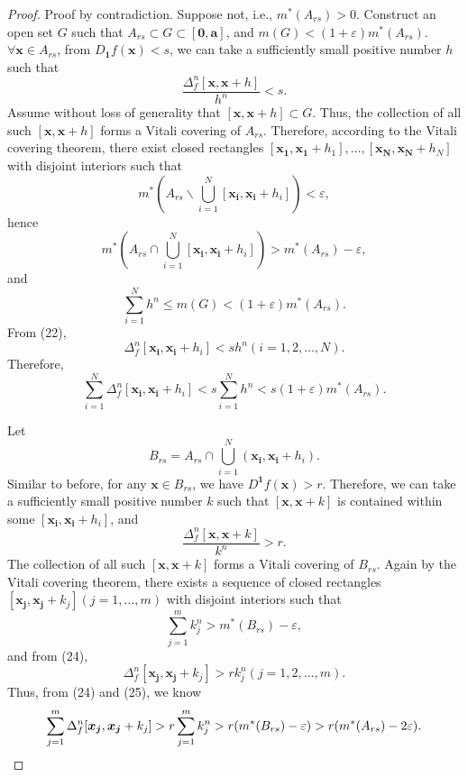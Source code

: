 \documentclass{ijclclp}
\begin{document}
\begin{proof}
    Proof by contradiction. Suppose not, i.e., \(m^{*}(A_{rs})>0\). Construct an open set \(G\) such that \(A_{rs}\subset G\subset[\boldsymbol{0},\boldsymbol{a}]\), and \(m(G)<(1+\varepsilon)m^{*}(A_{rs})\). \(\forall \boldsymbol{x}\in A_{rs}\), from \(D_{\boldsymbol{1}}f(\boldsymbol{x})<s\), we can take a sufficiently small positive number \(h\) such that
    \begin{equation}
        \frac{\Delta_f^n[\boldsymbol{x},\boldsymbol{x}+h]}{h^n}<s.
    \end{equation}
    Assume without loss of generality that \([\boldsymbol{x},\boldsymbol{x}+h]\subset G\). Thus, the collection of all such \([\boldsymbol{x},\boldsymbol{x}+h]\) forms a Vitali covering of \(A_{rs}\). Therefore, according to the Vitali covering theorem, there exist closed rectangles \([\boldsymbol{x_1},\boldsymbol{x_1}+h_1],\dots,[\boldsymbol{x_N},\boldsymbol{x_N}+h_N]\) with disjoint interiors such that
    \[m^{*}\left(A_{rs}\backslash\bigcup_{i=1}^{N}[\boldsymbol{x_i},\boldsymbol{x_i}+h_i]\right)<\varepsilon,\]
    hence 
    \[m^{*}\left(A_{rs}\cap\bigcup_{i=1}^{N}[\boldsymbol{x_i},\boldsymbol{x_i}+h_i]\right)>m^{*}(A_{rs})-\varepsilon,\]
    and 
    \[\sum_{i=1}^{N}h^n\leqslant m(G)<(1+\varepsilon)m^{*}(A_{rs}).\]
    From (22), 
    \[\Delta_f^n[\boldsymbol{x_i},\boldsymbol{x_i}+h_i]<sh^n(i=1,2,\dots,N).\]
    Therefore, 
    \begin{equation}
        \sum_{i=1}^{N}\Delta_f^n[\boldsymbol{x_i},\boldsymbol{x_i}+h_i]<s\sum_{i=1}^{N}h^n<s(1+\varepsilon)m^{*}(A_{rs}).
    \end{equation}
    
    Let
    \[B_{rs}=A_{rs}\cap\bigcup_{i=1}^{N}(\boldsymbol{x_i},\boldsymbol{x_i}+h_i).\]
    Similar to before, for any \(\boldsymbol{x}\in B_{rs}\), we have \(D^{\boldsymbol{1}}f(\boldsymbol{x})>r\). Therefore, we can take a sufficiently small positive number \(k\) such that \([\boldsymbol{x},\boldsymbol{x}+k]\) is contained within some \([\boldsymbol{x_i},\boldsymbol{x_i}+h_i]\), and
    \begin{equation}
        \frac{\Delta_f^n[\boldsymbol{x},\boldsymbol{x}+k]}{k^n}>r.
    \end{equation}
    The collection of all such \([\boldsymbol{x},\boldsymbol{x}+k]\) forms a Vitali covering of \(B_{rs}\). Again by the Vitali covering theorem, there exists a sequence of closed rectangles \([\boldsymbol{x_j},\boldsymbol{x_j}+k_j](j=1,\dots,m)\) with disjoint interiors such that
    \begin{equation}
        \sum_{j=1}^{m}k_{j}^n>m^{*}(B_{rs})-\varepsilon,
    \end{equation}
    and from (24), 
    \[\Delta_f^n[\boldsymbol{x_j},\boldsymbol{x_j}+k_j]>rk_j^n(j=1,2,\dots,m).\]
    Thus, from (24) and (25), we know 
    \begin{equation}
        \sum_{j=1}^{m}\Delta_f^n[\boldsymbol{x_j},\boldsymbol{x_j}+k_j]
        >r\sum_{j=1}^{m}k_j^n\\
        >r(m^{*}(B_{rs})-\varepsilon)>r(m^{*}(A_{rs})-2\varepsilon).
    \end{equation}
    

\end{proof}
\end{document}

